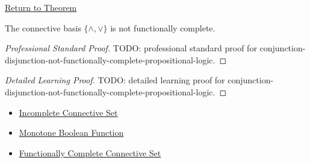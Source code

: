 \newpage
{}
\label{prf:conjunction-disjunction-not-functionally-complete-propositional-logic}

\begin{remark*}[Return]
\hyperref[thm:conjunction-disjunction-not-functionally-complete-propositional-logic]{Return to Theorem}
\end{remark*}

\begin{theorem*}
The connective basis \(\{\land,\lor\}\) is not functionally complete.
\end{theorem*}

\begin{proof}[Professional Standard Proof]
\LRAProofBodyStart
TODO: professional standard proof for conjunction-disjunction-not-functionally-complete-propositional-logic.
\end{proof}

\begin{proof}[Detailed Learning Proof]
\LRAProofBodyStart
TODO: detailed learning proof for conjunction-disjunction-not-functionally-complete-propositional-logic.
\end{proof}

\begin{remark*}
\end{remark*}

\begin{dependencies}
\begin{itemize}
  \item \hyperref[def:incomplete-connective-set-propositional-logic]{Incomplete Connective Set}
  \item \hyperref[def:monotone-boolean-function-propositional-logic]{Monotone Boolean Function}
  \item \hyperref[def:functionally-complete-connective-set-propositional-logic]{Functionally Complete Connective Set}
\end{itemize}
\end{dependencies}

\clearpage
